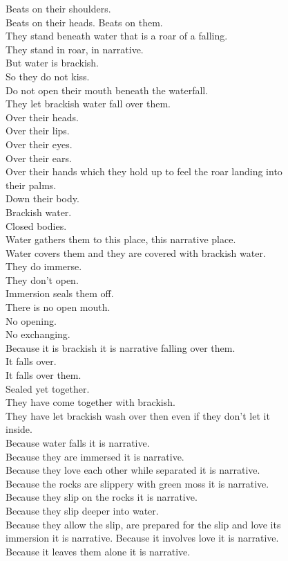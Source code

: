 Beats on their shoulders.\\
Beats on their heads. Beats on them.\\
They stand beneath water that is a roar of a falling.\\
They stand in roar, in narrative.\\
But water is brackish.\\
So they do not kiss.\\
Do not open their mouth beneath the waterfall.\\
They let brackish water fall over them.\\
Over their heads.\\
Over their lips.\\
Over their eyes.\\
Over their ears.\\
Over their hands which they hold up to feel the roar landing into\\
their palms.\\
Down their body.\\
Brackish water.\\
Closed bodies.\\
Water gathers them to this place, this narrative place.\\
Water covers them and they are covered with brackish water.\\
They do immerse.\\
They don't open.\\
Immersion seals them off.\\
There is no open mouth.\\
No opening.\\
No exchanging.\\
Because it is brackish it is narrative falling over them.\\
It falls over.\\
It falls over them.\\
Sealed yet together.\\
They have come together with brackish.\\
They have let brackish wash over then even if they don't let it\\
inside.\\
Because water falls it is narrative.\\
Because they are immersed it is narrative.\\
Because they love each other while separated it is narrative.\\
Because the rocks are slippery with green moss it is narrative.\\
Because they slip on the rocks it is narrative.\\
Because they slip deeper into water.\\
Because they allow the slip, are prepared for the slip and love its\\
immersion it is narrative. Because it involves love it is narrative.\\
Because it leaves them alone it is narrative.\\
~\\

